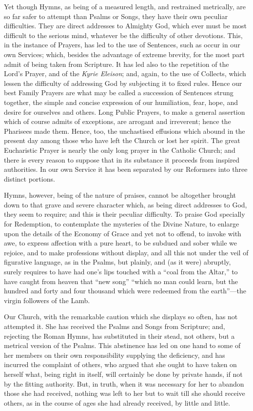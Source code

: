 Yet though Hymns, as being of a measured length,
and restrained metrically, are so far safer to attempt than Psalms or
Songs, they have their own peculiar difficulties. They are direct
addresses to Almighty God, which ever must be most difficult to the
serious mind, whatever be the difficulty of other devotions. This, in
the instance of Prayers, has led to the use of Sentences, such as
occur in our own Services; which, besides the advantage of extreme
brevity, for the most part admit of being taken from Scripture. It has
led also to the repetition of the Lord's Prayer, and of the \emph{Kyrie
Eleison}; and, again, to the use of Collects, which lessen the
difficulty of addressing God by subjecting it to fixed rules. Hence
our best Family Prayers are what may be called a succession of
Sentences strung together, the simple and concise expression of our
humiliation, fear, hope, and desire for ourselves and others. Long
Public Prayers, to make a general assertion which of course admits of
exceptions, are arrogant and irreverent; hence the Pharisees made
them. Hence, too, the unchastised effusions which abound in the
present day among those who have left the Church or lost her spirit.
The great Eucharistic Prayer is nearly the only long prayer in the Catholic Church; and there is every reason to suppose that in its
substance it proceeds from inspired authorities. In our own Service it
has been separated by our Reformers into three distinct portions.

Hymns, however, being of the nature of praises,
cannot be altogether brought down to that grave and severe character
which, as being direct addresses to God, they seem to require; and
this is their peculiar difficulty. To praise God specially for
Redemption, to contemplate the mysteries of the Divine Nature, to
enlarge upon the details of the Economy of Grace and yet not to
offend, to invoke with awe, to express affection with a pure heart, to
be subdued and sober while we rejoice, and to make professions without
display, and all this not under the veil of figurative language, as in
the Psalms, but plainly, and (as it were) abruptly, surely requires to
have had one's lips touched with a ``coal from the Altar,'' to have
caught from heaven that ``new song'' ``which no man could learn, but the
hundred and forty and four thousand which were redeemed from the earth''—the
virgin followers of the Lamb.

Our Church, with the remarkable caution which she
displays so often, has not attempted it. She has received the Psalms
and Songs from Scripture; and, rejecting the Roman Hymns, has
substituted in their stead, not others, but a metrical version of the
Psalms. This abstinence has led on one hand to some of her
members on their own responsibility supplying the deficiency, and has
incurred the complaint of others, who argued that she ought to have
taken on herself what, being right in itself, will certainly be done
by private hands, if not by the fitting authority. But, in truth, when
it was necessary for her to abandon those she had received, nothing
was left to her but to wait till she should receive others, as in the
course of ages she had already received, by little and little.

